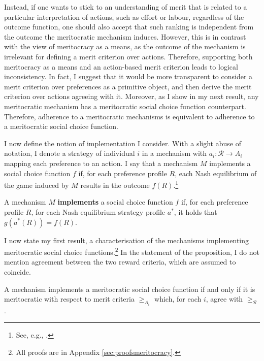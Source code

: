 Instead, if one wants to stick to an understanding of merit that is related to a particular interpretation of actions, such as effort or labour, regardless of the outcome function, one should also accept that such ranking is independent from the outcome the meritocratic mechanism induces. However, this is in contrast with the view of meritocracy as a means, as the outcome of the mechanism is irrelevant for defining a merit criterion over actions. Therefore, supporting both meritocracy as a means and an action-based merit criterion leads to logical inconsistency. In fact, I suggest that it would be more transparent to consider a merit criterion over preferences as a primitive object, and then derive the merit criterion over actions agreeing with it. Moreover, as I show in my next result, any meritocratic mechanism has a meritocratic social choice function counterpart. Therefore, adherence to a meritocratic mechanisms is equivalent to adherence to a meritocratic social choice function.

I now define the notion of implementation I consider. With a slight abuse of notation, I denote a strategy of individual \( i \) in a mechanism with \( a_{i} \colon \mathcal{R} \rightarrow A_i \) mapping each preference to an action. I say that a mechanism \( M \) implements a social choice function \( f \) if, for each preference profile \( R \), each Nash equilibrium of the game induced by \( M \) results in the outcome \( f ( R ) \).\footnote{See, e.g., \citet[p. 913]{mas-colellMicroeconomicTheory1995}.}

\begin{definition}
	A mechanism \( M \) \textbf{implements} a social choice function \( f \) if, for each preference profile \( R \), for each Nash equilibrium strategy profile \( a^{*} \), it holds that \( g( a^{*} ( R ) ) = f ( R ) \).
\end{definition}

I now state my first result, a characterisation of the mechanisms implementing meritocratic social choice functions.\footnote{All proofs are in Appendix \ref{sec:proofsmeritocracy}.} In the statement of the proposition, I do not mention agreement between the two reward criteria, which are assumed to coincide.

\begin{prop}\label{prop:impl}
	A mechanism implements a meritocratic social choice function if and only if it is meritocratic with respect to merit criteria \( \geq_{A_i} \) which, for each \( i \), agree with \( \geq_{\mathcal{R}} \).
\end{prop}

